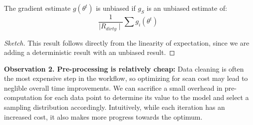 \begin{lemma}
The gradient estimate $g(\theta^{t})$ is unbiased if $g_S$ is an unbiased estimate of:
\[
\frac{1}{\mid R_{dirty} \mid} \sum g_i(\theta^{t})
\]
\end{lemma}
\begin{proof}[Sketch]
This result follows directly from the linearity of expectation, since we are adding a deterministic result with an unbiased result.
\end{proof}

\vspace{0.5em}

\noindent\textbf{Observation 2. Pre-processing is relatively cheap: }
Data cleaning is often the most expensive step in the workflow, so optimizing for scan cost may lead to neglible overall time improvements.
We can sacrifice a small overhead in pre-computation for each data point to determine its value to the model and select a sampling distribution accordingly.
Intuitively, while each iteration has an increased cost, it also makes more progress towards the optimum.

